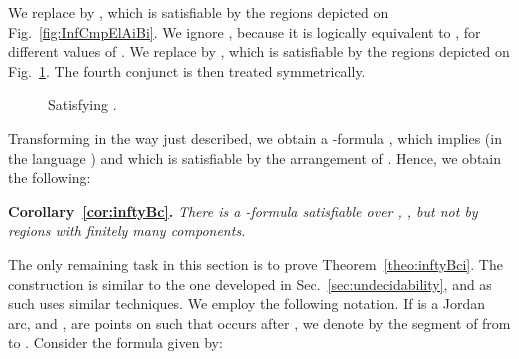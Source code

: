 \documentclass{article}
\newenvironment{swetheorem}[1]{\par\medskip\noindent\textbf{#1.}\hspace*{0.5em}\em}{\par\smallskip}
\begin{document}
We replace  by ,
which is satisfiable by the regions depicted on Fig.~\ref{fig:InfCmpElAiBi}.
We ignore , because it is logically equivalent to 
, for different values of . We replace 
 by , 
which is satisfiable by the regions depicted on Fig.~\ref{fig:InfCmpElAiAi2}. The fourth 
conjunct is then treated symmetrically.
\begin{figure}[h]
\begin{center}
\end{center}
	\caption{Satisfying .}
	\label{fig:InfCmpElAiAi2}	
\end{figure}
Transforming  in the way just described, we obtain a
-formula , which implies  (in the
language ) and which is satisfiable by the arrangement of
. Hence, we obtain the following:
\begin{swetheorem}{Corollary~\ref{cor:inftyBc}} 
There is a -formula satisfiable over , ,
but not by regions with finitely many components.
\end{swetheorem}

The only remaining task in this section is to prove Theorem~\ref{theo:inftyBci}.
The construction is similar to the one developed in Sec.~\ref{sec:undecidability},
and as such uses similar techniques. We employ the following notation. 
If  is a Jordan arc, and ,  are points on  such that 
 occurs after , we denote by  the segment of  from 
 to .
Consider the formula  given by:
\end{document}
